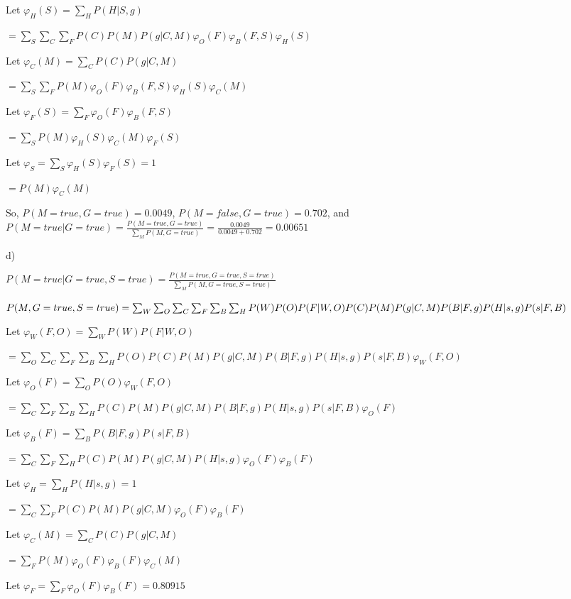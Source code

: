 \documentclass[12pt]{article}
\begin{document}
Let $\varphi_H(S) = \sum_H P(H \vert S, g)$

$= \sum_S\sum_C\sum_F P(C)P(M)P(g \vert C, M)\varphi_O(F)\varphi_B(F, S)\varphi_H(S)$

Let $\varphi_C(M) = \sum_C P(C)P(g \vert C, M)$

$= \sum_S\sum_F P(M)\varphi_O(F)\varphi_B(F, S)\varphi_H(S)\varphi_C(M)$

Let $\varphi_F(S) = \sum_F \varphi_O(F)\varphi_B(F, S)$

$= \sum_S P(M)\varphi_H(S)\varphi_C(M)\varphi_F(S)$

Let $\varphi_S = \sum_S \varphi_H(S)\varphi_F(S) = 1$

$= P(M)\varphi_C(M)$

So, $P(M = true, G = true) = 0.0049$, $P(M = false, G = true) = 0.702$, and $P(M = true \vert G = true) = \frac{P(M = true, G = true)}{\sum_M P(M, G = true)} = \frac{0.0049}{0.0049 + 0.702} = \mathbf{0.00651}$

d) 

$P(M = true \vert G = true, S = true) = \frac{P(M = true, G = true, S = true)}{\sum_M P(M, G = true, S = true)}$

$P(M, G = true, S = true) = \sum_W\sum_O\sum_C\sum_F\sum_B\sum_H P(W)P(O)P(F\vert W, O)P(C)P(M)P(g \vert C, M)\\P(B \vert F, g)P(H \vert s, g)P(s \vert F, B)$

Let $\varphi_W(F, O) = \sum_W P(W)P(F \vert W, O)$

$= \sum_O\sum_C\sum_F\sum_B\sum_H P(O)P(C)P(M)P(g \vert C, M)P(B \vert F, g)P(H \vert s, g)P(s \vert F, B)\varphi_W(F, O)$

Let $\varphi_O(F) = \sum_O P(O)\varphi_W(F, O)$

$= \sum_C\sum_F\sum_B\sum_H P(C)P(M)P(g \vert C, M)P(B \vert F, g)P(H \vert s, g)P(s \vert F, B)\varphi_O(F)$

Let $\varphi_B(F) = \sum_B P(B \vert F, g)P(s \vert F, B)$

$= \sum_C\sum_F\sum_H P(C)P(M)P(g \vert C, M)P(H \vert s, g)\varphi_O(F)\varphi_B(F)$

Let $\varphi_H = \sum_H P(H \vert s, g) = 1$

$= \sum_C\sum_F P(C)P(M)P(g \vert C, M)\varphi_O(F)\varphi_B(F)$

Let $\varphi_C(M) = \sum_C P(C)P(g \vert C, M)$

$= \sum_F P(M)\varphi_O(F)\varphi_B(F)\varphi_C(M)$

Let $\varphi_F = \sum_F \varphi_O(F)\varphi_B(F) = 0.80915$
\end{document}
